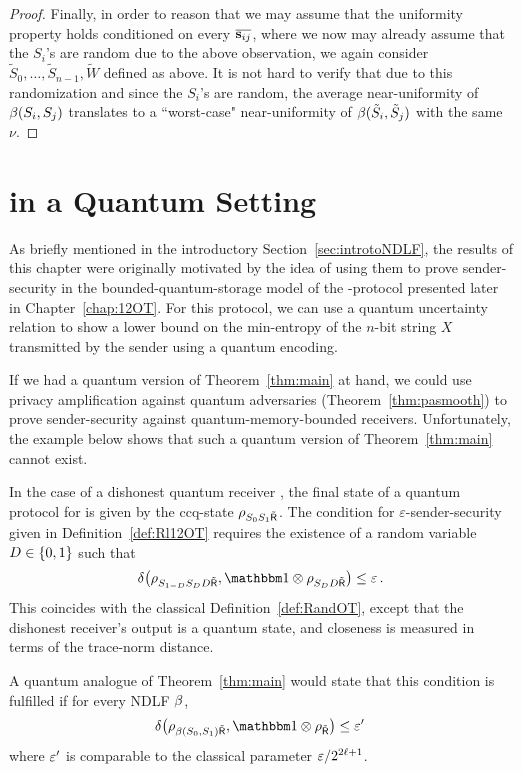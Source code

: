 \begin{proof}
Finally, in order to reason that we may assume that the uniformity
property holds conditioned on every $\overline{\text{\boldmath${\bf s}$}_{ij}}$, where we
now may already assume that the $S_i$'s are random due to the above
observation, we again consider
$\tilde{S}_0,\ldots,\tilde{S}_{n-1},\tilde{W}$ defined as above. It is
not hard to verify that due to this randomization and since the
$S_i$'s are random, the average near-uniformity of $\beta(S_i,S_j)$
translates to a ``worst-case" near-uniformity of
$\beta(\tilde{S}_i,\tilde{S}_j)$ with the same $\nu$.
\end{proof}


\section{\OT in a Quantum Setting} \label{sec:quantumdoesnotwork}
As briefly mentioned in the introductory
Section~\ref{sec:introtoNDLF}, the results of this chapter were
originally motivated by the idea of using them to prove
sender-security in the bounded-quantum-storage model of the
\OT-protocol presented later in Chapter~\ref{chap:12OT}.  For this
protocol, we can use a quantum 
uncertainty relation to show a lower bound on the min-entropy of the
$n$-bit string $X$ transmitted by the sender using a quantum encoding.

If we had a quantum version of Theorem~\ref{thm:main} at hand, we
could use privacy amplification against quantum adversaries
(Theorem~\ref{thm:pasmooth}) to prove sender-security against
quantum-memory-bounded receivers. Unfortunately, the example below
shows that such a quantum version of Theorem~\ref{thm:main} cannot
exist.

In the case of a dishonest quantum receiver \dR, the final state of a quantum
protocol for \RandOT is given by the ccq-state $\rho_{S_0 S_1 \tilde{\sf R}}$.
The condition for $\varepsilon$-sender-security given in
Definition~\ref{def:Rl12OT} requires the existence of a random
variable $D \in \{0,1\}$ such that
$$
  \dist{ \rho_{S_{1-D} S_D D \dR} , \id \otimes \rho_{S_D
      D \dR} } \leq \eps \, .
$$
This coincides with the classical Definition~\ref{def:RandOT},
except that the dishonest receiver's output is a quantum state, and
closeness is measured in terms of the trace-norm distance.

A quantum analogue of Theorem~\ref{thm:main} would state that this
condition is fulfilled if for every 
NDLF $\beta$,
$$
  \dist{ \rho_{\bal(S_0,S_1) \dR} , \id \otimes \rho_{\dR} } \leq
  \eps' \, 
$$
where $\varepsilon'$ is comparable to the classical parameter $\varepsilon/2^{2
\ell+1}$.

